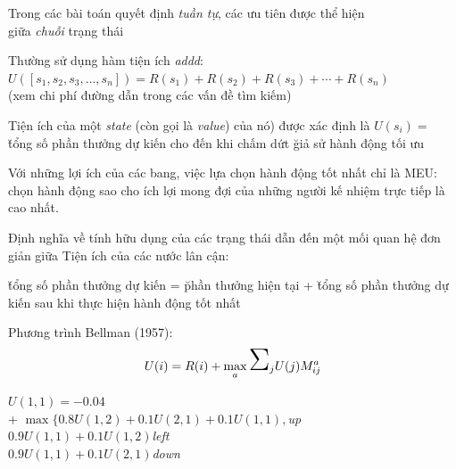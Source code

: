 \documentclass[fleqn]{article}
\begin{document}
\begin{huge}
{Trong các bài toán quyết định {\em tuần tự}, các ưu tiên được thể hiện\\
giữa {\em chuỗi} trạng thái

Thường sử dụng hàm tiện ích {\em addd}:\nl
$U([s_1,s_2,s_3,\ldots,s_n]) = R(s_1) + R(s_2) + R(s_3) + \cdots + R(s_n)$\\
(xem chi phí đường dẫn trong các vấn đề tìm kiếm)

Tiện ích của một {\em state} (còn gọi là {\em value}) của nó) được xác định là \nl
$U(s_i) = {}$ \u{tổng số phần thưởng dự kiến cho đến khi chấm dứt}\nl
{} \u{giả sử hành động tối ưu}

Với những lợi ích của các bang, việc lựa chọn
hành động tốt nhất chỉ là MEU: chọn hành động sao cho
ích lợi mong đợi của những người kế nhiệm trực tiếp là cao nhất.



Định nghĩa về tính hữu dụng của các trạng thái dẫn đến một mối quan hệ đơn giản giữa
Tiện ích của các nước lân cận:

\u{tổng số phần thưởng dự kiến}\al
= \u{phần thưởng hiện tại}\nl
+ \u{tổng số phần thưởng dự kiến sau khi thực hiện hành động tốt nhất}

Phương trình Bellman (1957):
\[ U(i) = R(i) + \max_a \mysum_j U(j) M_{ij}^a\]

$U(1,1) = -0.04$\\
\tab + $\max\{ 0.8 U(1,2) + 0.1 U(2,1) + 0.1 U(1,1),$\hfill{\em up\\
\tab \phantom{+ \mbox{$\max\{$}}$0.9 U(1,1) + 0.1 U(1,2) $\hfill{\em left\\
\tab \phantom{+ \mbox{$\max\{$}}$0.9 U(1,1) + 0.1 U(2,1) $\hfill{\em down\\
\tab {}}}}}
\end{huge}
\end{document}
